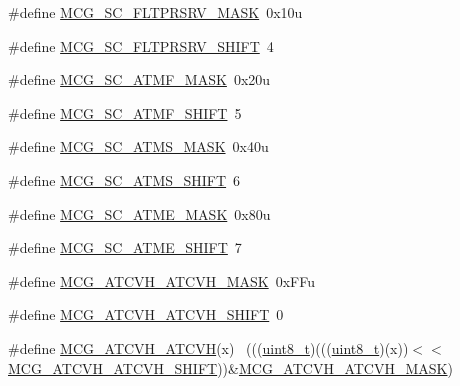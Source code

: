 \begin{DoxyCompactItemize}
\item 
\#define \hyperlink{group___m_c_g___register___masks_ga1eea80f4646116c2ca2a68aa3469436a}{M\+C\+G\+\_\+\+S\+C\+\_\+\+F\+L\+T\+P\+R\+S\+R\+V\+\_\+\+M\+A\+SK}~0x10u
\item 
\#define \hyperlink{group___m_c_g___register___masks_gac75a3cb915913ba4acc64a098bba4eb5}{M\+C\+G\+\_\+\+S\+C\+\_\+\+F\+L\+T\+P\+R\+S\+R\+V\+\_\+\+S\+H\+I\+FT}~4
\item 
\#define \hyperlink{group___m_c_g___register___masks_ga15326687d7d214b4847a3cae6e6cdfaa}{M\+C\+G\+\_\+\+S\+C\+\_\+\+A\+T\+M\+F\+\_\+\+M\+A\+SK}~0x20u
\item 
\#define \hyperlink{group___m_c_g___register___masks_gac7fd1ff91fc1de6800a18f875398d966}{M\+C\+G\+\_\+\+S\+C\+\_\+\+A\+T\+M\+F\+\_\+\+S\+H\+I\+FT}~5
\item 
\#define \hyperlink{group___m_c_g___register___masks_gaf5a12b51cc62a0ce10f3fbecdebd0222}{M\+C\+G\+\_\+\+S\+C\+\_\+\+A\+T\+M\+S\+\_\+\+M\+A\+SK}~0x40u
\item 
\#define \hyperlink{group___m_c_g___register___masks_ga9a8ce406d5868276e9c3b37190ab89b1}{M\+C\+G\+\_\+\+S\+C\+\_\+\+A\+T\+M\+S\+\_\+\+S\+H\+I\+FT}~6
\item 
\#define \hyperlink{group___m_c_g___register___masks_gaf9545e815c86bd04d8513af024cb8617}{M\+C\+G\+\_\+\+S\+C\+\_\+\+A\+T\+M\+E\+\_\+\+M\+A\+SK}~0x80u
\item 
\#define \hyperlink{group___m_c_g___register___masks_ga146594251d4266d02fecc44c1f0dd6ae}{M\+C\+G\+\_\+\+S\+C\+\_\+\+A\+T\+M\+E\+\_\+\+S\+H\+I\+FT}~7
\item 
\#define \hyperlink{group___m_c_g___register___masks_gaf989f84acb1a8c91c7c98c2255651b00}{M\+C\+G\+\_\+\+A\+T\+C\+V\+H\+\_\+\+A\+T\+C\+V\+H\+\_\+\+M\+A\+SK}~0x\+F\+Fu
\item 
\#define \hyperlink{group___m_c_g___register___masks_ga0fec2d450a98ab78dc7a2e4e9e33dbc6}{M\+C\+G\+\_\+\+A\+T\+C\+V\+H\+\_\+\+A\+T\+C\+V\+H\+\_\+\+S\+H\+I\+FT}~0
\item 
\#define \hyperlink{group___m_c_g___register___masks_gabc2689bb75b7c4cc672293dd43cdcc9d}{M\+C\+G\+\_\+\+A\+T\+C\+V\+H\+\_\+\+A\+T\+C\+VH}(x)                                          ~(((\hyperlink{_p_e___types_8h_aba7bc1797add20fe3efdf37ced1182c5}{uint8\+\_\+t})(((\hyperlink{_p_e___types_8h_aba7bc1797add20fe3efdf37ced1182c5}{uint8\+\_\+t})(x))$<$$<$\hyperlink{group___m_c_g___register___masks_ga0fec2d450a98ab78dc7a2e4e9e33dbc6}{M\+C\+G\+\_\+\+A\+T\+C\+V\+H\+\_\+\+A\+T\+C\+V\+H\+\_\+\+S\+H\+I\+FT}))\&\hyperlink{group___m_c_g___register___masks_gaf989f84acb1a8c91c7c98c2255651b00}{M\+C\+G\+\_\+\+A\+T\+C\+V\+H\+\_\+\+A\+T\+C\+V\+H\+\_\+\+M\+A\+SK})
$$
\end{DoxyCompactItemize}
